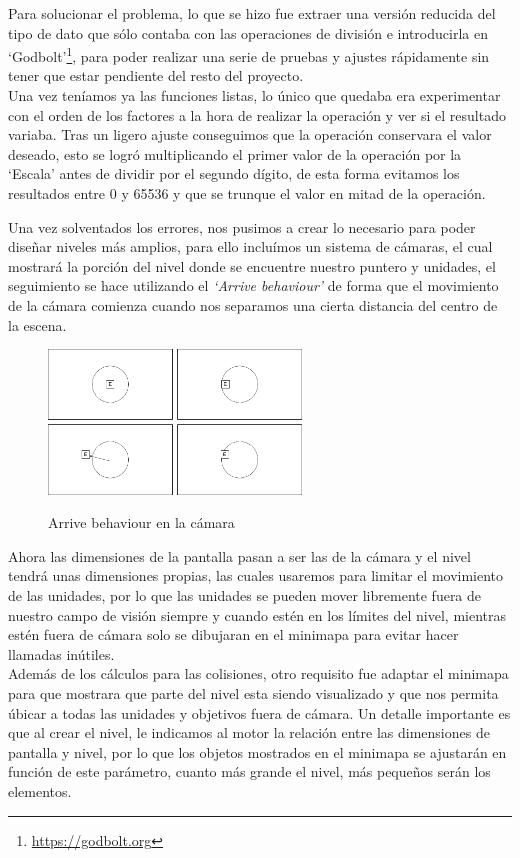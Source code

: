 Para solucionar el problema, lo que se hizo fue extraer una versión reducida del tipo de dato que sólo contaba
con las operaciones de división e introducirla en `Godbolt'\footnote{\url{https://godbolt.org}}, para poder
realizar una serie de pruebas y ajustes rápidamente sin tener que estar pendiente del resto del proyecto. \\
Una vez teníamos ya las funciones listas, lo único que quedaba era experimentar con el orden de los
factores a la hora de realizar la operación y ver si el resultado variaba. Tras un ligero ajuste conseguimos
que la operación conservara el valor deseado, esto se logró multiplicando el primer valor de la operación
por la `Escala' antes de dividir por el segundo dígito, de esta forma evitamos los resultados entre 0 y 65536
y que se trunque el valor en mitad de la operación.

Una vez solventados los errores, nos pusimos a crear lo necesario para poder diseñar niveles más amplios,
para ello incluímos un sistema de cámaras, el cual mostrará la porción del nivel donde se encuentre
nuestro puntero y unidades, el seguimiento se hace utilizando el \textit{`Arrive behaviour'} de forma que
el movimiento de la cámara comienza cuando nos separamos una cierta distancia del centro de la escena.

\begin{figure}[ht]
\centering
\includegraphics[width=0.6\textwidth]{imagenes/diario_desarrollo/camara.png}\\
\caption{Arrive behaviour en la cámara}
\label{fig:arrive_cam}
\end{figure}

Ahora las dimensiones de la pantalla pasan a ser las de la cámara y el nivel tendrá unas dimensiones
propias, las cuales usaremos para limitar el movimiento de las unidades, por lo que las unidades se pueden
mover libremente fuera de nuestro campo de visión siempre y cuando estén en los límites del nivel,
mientras estén fuera de cámara solo se dibujaran en el minimapa para evitar hacer llamadas inútiles. \\
Además de los cálculos para las colisiones, otro requisito fue adaptar el minimapa para que mostrara
que parte del nivel esta siendo visualizado y que nos permita úbicar a todas las unidades y objetivos
fuera de cámara. Un detalle importante es que al crear el nivel, le indicamos al motor la relación
entre las dimensiones de pantalla y nivel, por lo que los objetos mostrados en el minimapa se ajustarán
en función de este parámetro, cuanto más grande el nivel, más pequeños serán los elementos.


